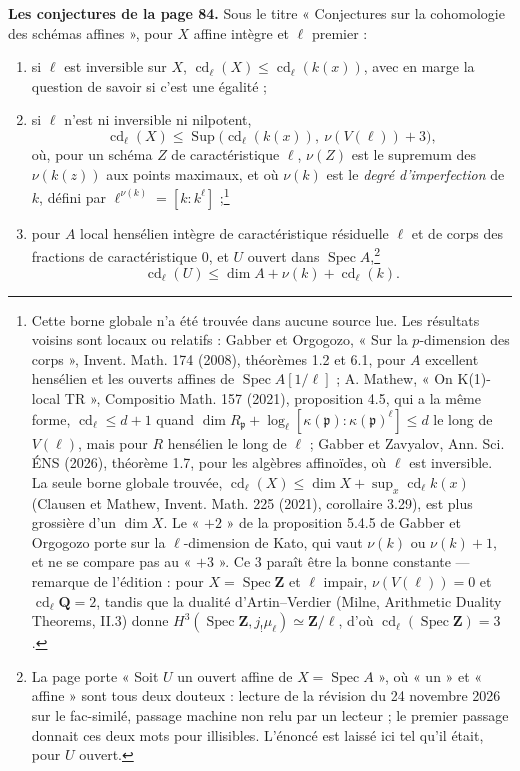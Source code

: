 \documentclass[11pt,a4paper]{article}
\begin{document}
\textbf{Les conjectures de la page 84.} Sous le titre « Conjectures sur la
cohomologie des schémas affines », pour $X$ affine intègre et $\ell$ premier :
\begin{enumerate}
\item[$1^{\circ}$)] si $\ell$ est inversible sur $X$,
$\operatorname{cd}_{\ell}(X) \leqslant \operatorname{cd}_{\ell}(k(x))$, avec en
marge la question de savoir si c'est une égalité ;
\item[$2^{\circ}$)] si $\ell$ n'est ni inversible ni nilpotent,
\[
\operatorname{cd}_{\ell}(X) \leqslant
\operatorname{Sup}\bigl(\operatorname{cd}_{\ell}(k(x)),\ \nu(V(\ell)) + 3\bigr),
\]
où, pour un schéma $Z$ de caractéristique $\ell$, $\nu(Z)$ est le supremum des
$\nu(k(z))$ aux points maximaux, et où $\nu(k)$ est le \emph{degré
d'imperfection} de $k$, défini par $\ell^{\nu(k)} = [k : k^{\ell}]$ ;\footnote{Cette borne globale n'a été trouvée dans aucune source lue. Les résultats voisins sont locaux ou relatifs : Gabber et Orgogozo, « Sur la $p$-dimension des corps », Invent. Math. 174 (2008), théorèmes 1.2 et 6.1, pour $A$ excellent hensélien et les ouverts affines de $\operatorname{Spec} A[1/\ell]$ ; A. Mathew, « On K(1)-local TR », Compositio Math. 157 (2021), proposition 4.5, qui a la même forme, $\operatorname{cd}_{\ell} \leqslant d + 1$ quand $\dim R_{\mathfrak p} + \log_{\ell}[\kappa(\mathfrak p) : \kappa(\mathfrak p)^{\ell}] \leqslant d$ le long de $V(\ell)$, mais pour $R$ hensélien le long de $\ell$ ; Gabber et Zavyalov, Ann. Sci. ÉNS (2026), théorème 1.7, pour les algèbres affinoïdes, où $\ell$ est inversible. La seule borne globale trouvée, $\operatorname{cd}_{\ell}(X) \leqslant \dim X + \sup_{x} \operatorname{cd}_{\ell} k(x)$ (Clausen et Mathew, Invent. Math. 225 (2021), corollaire 3.29), est plus grossière d'un $\dim X$. Le « $+2$ » de la proposition 5.4.5 de Gabber et Orgogozo porte sur la $\ell$-dimension de Kato, qui vaut $\nu(k)$ ou $\nu(k) + 1$, et ne se compare pas au « $+3$ ». Ce $3$ paraît être la bonne constante --- remarque de l'édition : pour $X = \operatorname{Spec} \mathbf{Z}$ et $\ell$ impair, $\nu(V(\ell)) = 0$ et $\operatorname{cd}_{\ell} \mathbf{Q} = 2$, tandis que la dualité d'Artin--Verdier (Milne, Arithmetic Duality Theorems, II.3) donne $H^{3}(\operatorname{Spec} \mathbf{Z}, j_{!}\mu_{\ell}) \simeq \mathbf{Z}/\ell$, d'où $\operatorname{cd}_{\ell}(\operatorname{Spec}\mathbf{Z}) = 3$.}
\item[$4^{\circ}$)] pour $A$ local hensélien intègre de caractéristique
résiduelle $\ell$ et de corps des fractions de caractéristique $0$, et $U$
ouvert dans $\operatorname{Spec} A$,\footnote{La page porte « Soit $U$ un ouvert affine de $X = \operatorname{Spec} A$ », où « un » et « affine » sont tous deux douteux : lecture de la révision du 24 novembre 2026 sur le fac-similé, passage machine non relu par un lecteur ; le premier passage donnait ces deux mots pour illisibles. L'énoncé est laissé ici tel qu'il était, pour $U$ ouvert.}
\[
\operatorname{cd}_{\ell}(U) \leqslant \dim A + \nu(k)
+ \operatorname{cd}_{\ell}(k).
\]
\end{enumerate}
\end{document}
